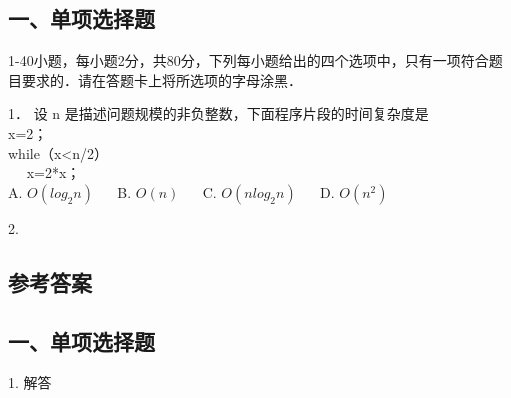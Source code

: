 
\subsection{一、单项选择题}
1-40小题，每小题2分，共80分，下列每小题给出的四个选项中，只有一项符合题目要求的．请在答题卡上将所选项的字母涂黑．

1． 设 n 是描述问题规模的非负整数，下面程序片段的时间复杂度是  \\
x=2；  \\
while（x<n/2）  \\
$\quad$ x=2*x；  \\
A. $O(log_2n)$ $\quad$ B. $O(n)$ $\quad$ C. $O(nlog_2n)$ $\quad$ D. $O(n^2)$

2. 


\subsection{参考答案}
\subsection{一、单项选择题}
1. 解答